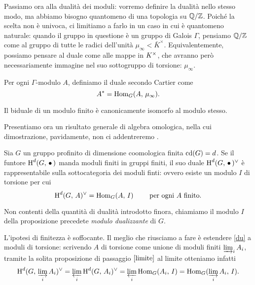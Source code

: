 Passiamo ora alla dualità dei moduli: vorremo definire la dualità nello stesso modo, ma abbiamo bisogno quantomeno di una topologia su $ \mathbb{Q}/\mathbb{Z} $. Poiché la scelta non è univoca, ci limitiamo a farlo in un caso in cui è quantomeno naturale: quando il gruppo in questione è un gruppo di Galois $ \Gamma $, pensiamo $ \mathbb{Q}/\mathbb{Z} $ come al gruppo di tutte le radici dell'unità $ \mu_\infty < \bar{K}^\times $. Equivalentemente, possiamo pensare al duale come alle mappe in $ K^\times $, che avranno però necessariamente immagine nel suo sottogruppo di torsione: $ \mu_\infty. $

\begin{definition}
	Per ogni $ \Gamma $-modulo $ A $, definiamo il duale secondo Cartier come
	\[ A^* = \operatorname{Hom}_G(A, \, \mu_\infty). \]
\end{definition}

\begin{proposition}
	Il biduale di un modulo finito è canonicamente isomorfo al modulo stesso.
\end{proposition}

Presentiamo ora un risultato generale di algebra omologica, nella cui dimostrazione, pavidamente, non ci addentreremo \cite[I.3.6]{SerreGalois}.
\begin{proposition}
	Sia $ G $ un gruppo profinito di dimensione coomologica finita $ \operatorname{cd}(G) = d $. Se il funtore $ \operatorname{H}^d(G,\, \bullet\,) $ manda moduli finiti in gruppi finiti, il suo duale $ \operatorname{H}^d(G,\, \bullet\,)^\vee $ è rappresentabile sulla sottocategoria dei moduli finti: ovvero esiste un modulo $ I $ di torsione per cui
	\begin{equation}\label{du}
		\operatorname{H}^d(G, \, A )^\vee = \operatorname{Hom}_G(A , \, I) \qquad \text{ per ogni } A \text{ finito.}
	\end{equation}
\end{proposition}

\begin{definition}
	Non contenti della quantità di dualità introdotto finora, chiamiamo il modulo $ I $ della proposizione precedete \emph{modulo dualizzante} di $ G $.
\end{definition}

L'ipotesi di finitezza è soffocante. Il meglio che riusciamo a fare è estendere \eqref{du} a moduli di torsione: scrivendo $ A $ di torsione come unione di moduli finiti $ \varinjlim_i A_i $, tramite la solita proposizione di passaggio $ \ref{limite} $ al limite otteniamo infatti
\[ \operatorname{H}^d(G, \, \varinjlim_i A_i )^\vee = \varprojlim_i \operatorname{H}^d(G, \, A_i )^\vee = \varprojlim_i \operatorname{Hom}_G(A_i , \, I) = \operatorname{Hom}_G(\varinjlim_i A_i , \, I). \]

